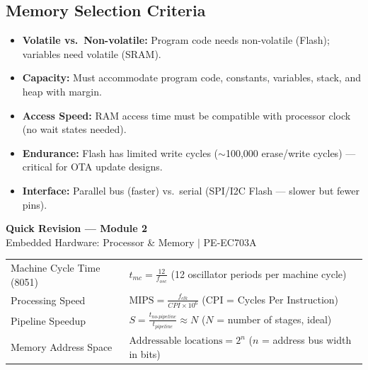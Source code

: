 \documentclass[12pt,a4paper]{article}
\renewcommand{\arraystretch}{1.45}
\begin{document}
\subsection{Memory Selection Criteria}
\begin{itemize}[leftmargin=*, itemsep=3pt]
  \item \textbf{Volatile vs.\ Non-volatile:} Program code needs non-volatile (Flash); variables need volatile (SRAM).
  \item \textbf{Capacity:} Must accommodate program code, constants, variables, stack, and heap with margin.
  \item \textbf{Access Speed:} RAM access time must be compatible with processor clock (no wait states needed).
  \item \textbf{Endurance:} Flash has limited write cycles ($\sim$100,000 erase/write cycles) --- critical for OTA update designs.
  \item \textbf{Interface:} Parallel bus (faster) vs.\ serial (SPI/I2C Flash --- slower but fewer pins).
\end{itemize}

\newpage
\begin{center}
  {\large\bfseries\color{myred} Quick Revision --- Module 2}\\[3pt]
  {\small\color{mydark} Embedded Hardware: Processor \& Memory $|$ PE-EC703A}
\end{center}
\noindent{\color{myred}\rule{\linewidth}{1.2pt}}
\vspace{4pt}

\begin{tcolorbox}[formulabox, title={\textbf{Key Formulas at a Glance}}]
\renewcommand{\arraystretch}{1.3}
\begin{tabularx}{\linewidth}{B{4.5cm} X}
Machine Cycle Time (8051) & $t_{mc} = \displaystyle\frac{12}{f_{osc}}$ \quad (12 oscillator periods per machine cycle) \\[4pt]
Processing Speed & $\text{MIPS} = \displaystyle\frac{f_{clk}}{CPI \times 10^6}$ \quad (CPI = Cycles Per Instruction) \\[4pt]
Pipeline Speedup & $S = \displaystyle\frac{t_{no\text{-}pipeline}}{t_{pipeline}} \approx N$ \quad ($N$ = number of stages, ideal) \\[4pt]
Memory Address Space & $\text{Addressable locations} = 2^n$ \quad ($n$ = address bus width in bits)
\end{tabularx}
\end{tcolorbox}
\end{document}
